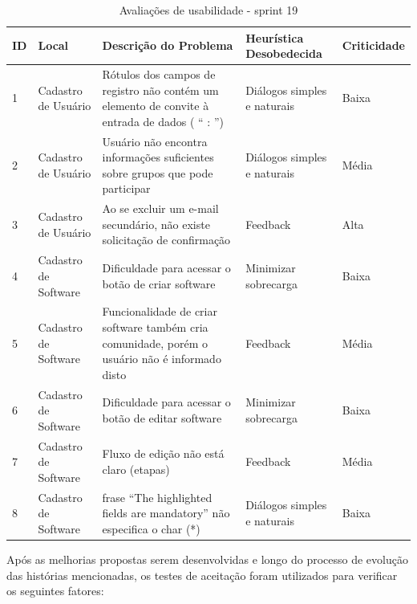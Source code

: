 \begin{table}[h!]

\begin{tabular}{|l|p{3cm}|p{6cm}|p{3cm}|l|}
\hline
\textbf{ID} & \textbf{Local} & \textbf{Descrição do Problema}                                                                                     & \textbf{Heurística Desobedecida} & \textbf{Criticidade} \\ \hline
1           & Cadastro de Usuário                 & Rótulos dos campos de registro não contém um elemento de convite à entrada de dados ( “ : ”) & Diálogos simples e naturais     & Baixa                \\ \hline
2           & Cadastro de Usuário                 & Usuário não encontra informações suficientes sobre grupos que pode participar  & Diálogos simples e naturais             & Média                \\ \hline
3           & Cadastro de Usuário               & Ao se excluir um e-mail secundário, não existe solicitação de confirmação       & Feedback                & Alta                \\ \hline
4           & Cadastro de Software     & Dificuldade para acessar o botão de criar software
	        & Minimizar sobrecarga          & Baixa                \\ \hline
5           & Cadastro de Software       & Funcionalidade de criar software também cria comunidade, porém o usuário não é informado disto  & Feedback    & Média                \\ \hline
6           & Cadastro de Software    & Dificuldade para acessar o botão de editar software
		    & Minimizar sobrecarga           & Baixa                \\ \hline
7           & Cadastro de Software    & Fluxo de edição não está claro (etapas)
			& Feedback                       & Média                \\ \hline
8           & Cadastro de Software    & frase ``The highlighted fields are mandatory'' não especifica o char (*)
		    &Diálogos simples e naturais     & Baixa                \\ \hline
\end{tabular}
\caption{Avaliações de usabilidade - sprint 19}
\label{tabela2a}
\end{table}

Após as melhorias propostas serem desenvolvidas e longo do processo de evolução das histórias mencionadas, os testes de aceitação foram utilizados para verificar os seguintes fatores:

